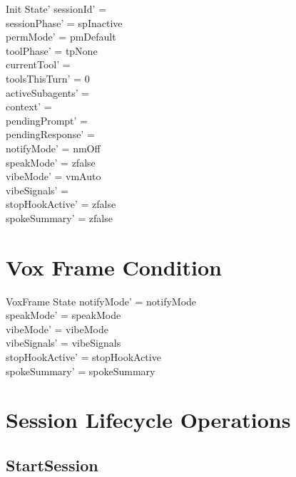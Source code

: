 \documentclass[a4paper,10pt,fleqn]{article}
\begin{document}
\begin{schema}{Init}
  State'
  \where
  sessionId' = \emptyset \\
  sessionPhase' = spInactive \\
  permMode' = pmDefault \\
  toolPhase' = tpNone \\
  currentTool' = \emptyset \\
  toolsThisTurn' = 0 \\
  activeSubagents' = \emptyset \\
  context' = \langle \rangle \\
  pendingPrompt' = \emptyset \\
  pendingResponse' = \emptyset \\
  notifyMode' = nmOff \\
  speakMode' = zfalse \\
  vibeMode' = vmAuto \\
  vibeSignals' = \emptyset \\
  stopHookActive' = zfalse \\
  spokeSummary' = zfalse
\end{schema}

\section{Vox Frame Condition}

\begin{schema}{VoxFrame}
  \Delta State
  \where
  notifyMode' = notifyMode \\
  speakMode' = speakMode \\
  vibeMode' = vibeMode \\
  vibeSignals' = vibeSignals \\
  stopHookActive' = stopHookActive \\
  spokeSummary' = spokeSummary
\end{schema}

\section{Session Lifecycle Operations}

\subsection{StartSession}
\end{document}
